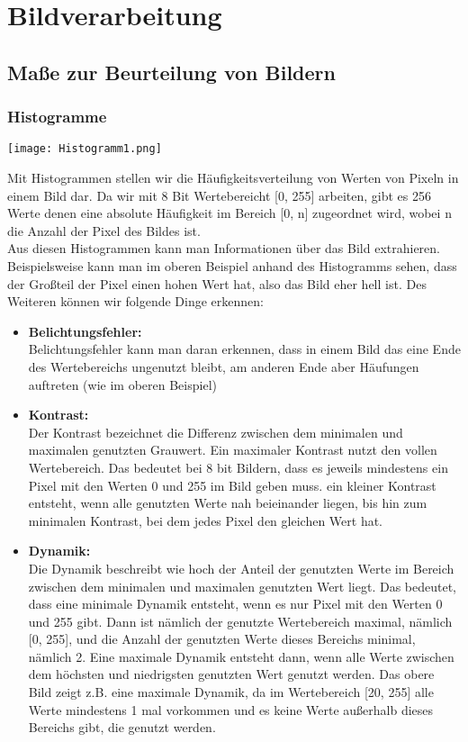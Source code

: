 \section{Bildverarbeitung}
\subsection{Maße zur Beurteilung von Bildern}


\subsubsection{Histogramme}
\texttt{[image: Histogramm1.png]}

Mit Histogrammen stellen wir die Häufigkeitsverteilung von Werten von Pixeln in einem Bild dar. Da wir mit 8 Bit Wertebereicht [0, 255] arbeiten, gibt es 256 Werte denen eine absolute Häufigkeit im Bereich [0, n] zugeordnet wird, wobei n die Anzahl der Pixel des Bildes ist.\\
Aus diesen Histogrammen kann man Informationen über das Bild extrahieren. Beispielsweise kann man im oberen Beispiel anhand des Histogramms sehen, dass der Großteil der Pixel einen hohen Wert hat, also das Bild eher hell ist. Des Weiteren können wir folgende Dinge erkennen:
\begin{itemize}
    \item \textbf{Belichtungsfehler:}\\
          Belichtungsfehler kann man daran erkennen, dass in einem Bild das eine Ende des Wertebereichs ungenutzt bleibt, am anderen Ende aber Häufungen auftreten (wie im oberen Beispiel)
    \item \textbf{Kontrast:}\\
          Der Kontrast bezeichnet die Differenz zwischen dem minimalen und maximalen genutzten Grauwert. Ein maximaler Kontrast nutzt den vollen Wertebereich. Das bedeutet bei 8 bit Bildern, dass es jeweils mindestens ein Pixel mit den Werten 0 und 255 im Bild geben muss. ein kleiner Kontrast entsteht, wenn alle genutzten Werte nah beieinander liegen, bis hin zum minimalen Kontrast, bei dem jedes Pixel den gleichen Wert hat.
    \item \textbf{Dynamik:}\\
          Die Dynamik beschreibt wie hoch der Anteil der genutzten Werte im Bereich zwischen dem minimalen und maximalen genutzten Wert liegt. Das bedeutet, dass eine minimale Dynamik entsteht, wenn es nur Pixel mit den Werten 0 und 255 gibt. Dann ist nämlich der genutzte Wertebereich maximal, nämlich [0, 255], und die Anzahl der genutzten Werte dieses Bereichs minimal, nämlich 2. Eine maximale Dynamik entsteht dann, wenn alle Werte zwischen dem höchsten und niedrigsten genutzten Wert genutzt werden. Das obere Bild zeigt z.B. eine maximale Dynamik, da im Wertebereich [20, 255] alle Werte mindestens 1 mal vorkommen und es keine Werte außerhalb dieses Bereichs gibt, die genutzt werden.
\end{itemize}

